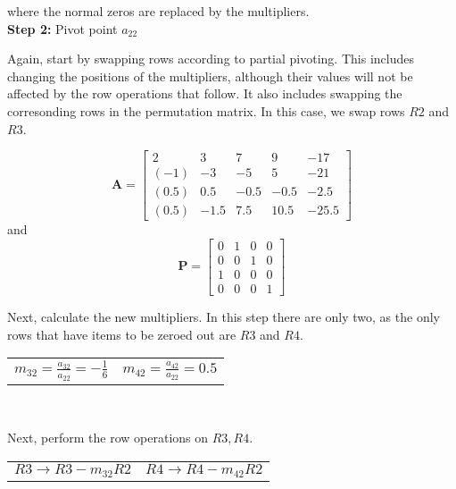\documentclass[11pt]{article}
\begin{document}
\begin{enumerate}
\begin{enumerate}[(a)]
				where the normal zeros are replaced by the multipliers. \\

				\textbf{Step 2:} Pivot point $a_{22}$

				Again, start by swapping rows according to partial pivoting. This includes changing the positions of the
				multipliers, although their values will not be affected by the row operations that follow. It also includes
				swapping the corresonding rows in the permutation matrix. In this case, we swap rows $R2$ and $R3$.

				\[
					\mathbf{A} =
					\begin{bmatrix}
						2 & 3 & 7 & 9 & -17 \\
						(-1) & -3 & -5 & 5 & -21 \\
						(0.5) & 0.5 & -0.5 & -0.5 & -2.5 \\
						(0.5) & -1.5 & 7.5 & 10.5 & -25.5
					\end{bmatrix}
				\]
				and
				\[
					\mathbf{P} =
					\begin{bmatrix}
						0 & 1 & 0 & 0 \\
						0 & 0 & 1 & 0 \\
						1 & 0 & 0 & 0 \\
						0 & 0 & 0 & 1
					\end{bmatrix}
				\]

				Next, calculate the new multipliers. In this step there are only two, as the only rows that have items to be
				zeroed out are $R3$ and $R4$.

				\begin{center}
				\begin{tabular}{c||c}

					$m_{32} = \frac{a_{32}}{a_{22}} = -\frac{1}{6}$ &
					$m_{42} = \frac{a_{42}}{a_{22}} = 0.5$ \\
				\end{tabular} \\
				\end{center}

				Next, perform the row operations on $R3, R4$.

				\begin{center}
				\begin{tabular}{c||c}

					$R3 \to R3 - m_{32}R2$ &
					$R4 \to R4 - m_{42}R2$ \\
				\end{tabular} \\
				\end{center}


\end{enumerate}
\end{enumerate}
\end{document}
